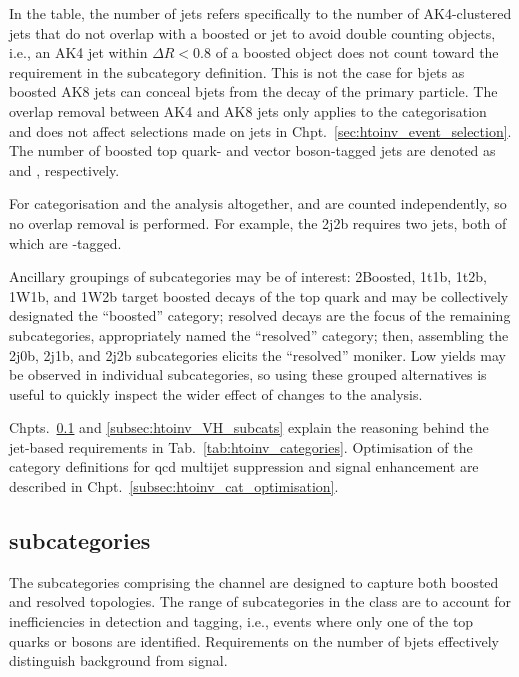 In the table, the number of \glspl{jet} \njet refers specifically to the number of AK4-clustered \glspl{jet} that do not overlap with a boosted \Ptop or \PVec \gls{jet} to avoid double counting objects, i.e., an AK4 \gls{jet} within $\Delta R < \text{0.8}$ of a boosted object does not count toward the \njet requirement in the subcategory definition. This is not the case for \glspl{bjet} as boosted AK8 \glspl{jet} can conceal \glspl{bjet} from the decay of the primary particle. The overlap removal between AK4 and AK8 \glspl{jet} only applies to the categorisation and does not affect selections made on \glspl{jet} in Chpt.~\ref{sec:htoinv_event_selection}. The number of boosted top quark- and vector boson-tagged \glspl{jet} are denoted as \nBoostedTop and \nBoostedV, respectively.

For categorisation and the analysis altogether, \njet and \nbjet are counted independently, so no overlap removal is performed. For example, the \VH 2j2b requires two \glspl{jet}, both of which are \Pbottom-tagged.

Ancillary groupings of subcategories may be of interest: 2Boosted, 1t1b, 1t2b, 1W1b, and 1W2b target boosted decays of the top quark and may be collectively designated the ``\ttH boosted'' category; resolved decays are the focus of the remaining subcategories, appropriately named the ``\ttH resolved'' category; then, assembling the 2j0b, 2j1b, and 2j2b \VH subcategories elicits the ``\VH resolved'' moniker. Low yields may be observed in individual subcategories, so using these grouped alternatives is useful to quickly inspect the wider effect of changes to the analysis.

Chpts.~\ref{subsec:htoinv_ttH_subcats} and \ref{subsec:htoinv_VH_subcats} explain the reasoning behind the \gls{jet}-based requirements in Tab.~\ref{tab:htoinv_categories}. Optimisation of the category definitions for \acrshort{qcd} multijet suppression and signal enhancement are described in Chpt.~\ref{subsec:htoinv_cat_optimisation}.




\subsection{\texorpdfstring{\ttH}{ttH} subcategories}
\label{subsec:htoinv_ttH_subcats}

The subcategories comprising the \ttH channel are designed to capture both boosted and resolved topologies. The range of subcategories in the class are to account for inefficiencies in detection and tagging, i.e., events where only one of the top quarks or \PW bosons are identified. Requirements on the number of \glspl{bjet} effectively distinguish background from signal.

